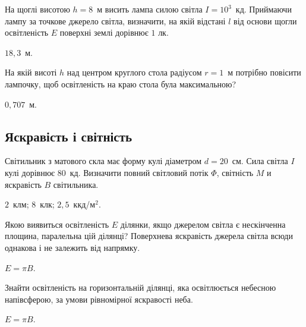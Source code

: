 \begin{problem}%
На щоглі висотою $h = 8$~м висить лампа силою світла $I = 10^3$~кд.
Приймаючи лампу за точкове джерело світла, визначити, на якій
відстані $l$ від основи щогли освітленість $E$ поверхні землі дорівнює $1$ лк.
\begin{solution}
	$18,3$~м.
\end{solution}
\end{problem}


\begin{problem}%
На якій висоті $h$ над центром круглого стола радіусом $r = 1$~м
потрібно повісити лампочку, щоб освітленість на краю стола була
максимальною?
\begin{solution}
	$0,707$~м.
\end{solution}
\end{problem}




\subsection*{Яскравість і світність}


\begin{problem}%
Світильник з матового скла має форму кулі діаметром $d = 20$~см. Сила
світла $I$ кулі дорівнює $80$~кд. Визначити повний світловий потік $\Phi$,
світність $M$ и яскравість $B$ світильника.
\begin{solution}
	$2$~клм; $8$~клк; $2,5$~ккд/м$^2$.
\end{solution}
\end{problem}

\begin{problem}%
Якою виявиться освітленість $E$ ділянки, якщо джерелом світла є
нескінченна площина, паралельна цій ділянці? Поверхнева яскравість
джерела світла всюди однакова і не залежить від напрямку.
\begin{solution}
	$E = \pi B$.
\end{solution}
\end{problem}


\begin{problem}%
Знайти освітленість на горизонтальній ділянці, яка освітлюється
небесною напівсферою, за умови рівномірної яскравості неба.
\begin{solution}
	$E = \pi B$.
\end{solution}
\end{problem}


